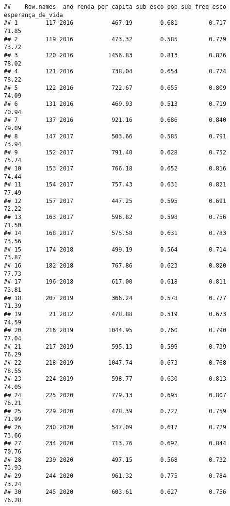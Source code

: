 \documentclass[
]{article}
\begin{document}
\begin{verbatim}
##    Row.names  ano renda_per_capita sub_esco_pop sub_freq_esco esperança_de_vida
## 1        117 2016           467.19        0.681         0.717             71.85
## 2        119 2016           473.32        0.585         0.779             73.72
## 3        120 2016          1456.83        0.813         0.826             78.02
## 4        121 2016           738.04        0.654         0.774             78.22
## 5        122 2016           722.67        0.655         0.809             74.09
## 6        131 2016           469.93        0.513         0.719             70.94
## 7        137 2016           921.16        0.686         0.840             79.09
## 8        147 2017           503.66        0.585         0.791             73.94
## 9        152 2017           791.40        0.628         0.752             75.74
## 10       153 2017           766.18        0.652         0.816             74.44
## 11       154 2017           757.43        0.631         0.821             77.49
## 12       157 2017           447.25        0.595         0.691             72.22
## 13       163 2017           596.82        0.598         0.756             71.50
## 14       168 2017           575.58        0.631         0.783             73.56
## 15       174 2018           499.19        0.564         0.714             73.87
## 16       182 2018           767.86        0.623         0.820             77.73
## 17       196 2018           617.00        0.618         0.811             73.81
## 18       207 2019           366.24        0.578         0.777             71.39
## 19        21 2012           478.88        0.519         0.673             74.59
## 20       216 2019          1044.95        0.760         0.790             77.04
## 21       217 2019           595.13        0.599         0.739             76.29
## 22       218 2019          1047.74        0.673         0.768             78.55
## 23       224 2019           598.77        0.630         0.813             74.05
## 24       225 2020           779.13        0.695         0.807             76.21
## 25       229 2020           478.39        0.727         0.759             71.99
## 26       230 2020           547.09        0.617         0.729             73.66
## 27       234 2020           713.76        0.692         0.844             70.76
## 28       239 2020           497.15        0.568         0.732             73.93
## 29       244 2020           961.32        0.775         0.784             73.24
## 30       245 2020           603.61        0.627         0.756             76.28

\end{verbatim}
\end{document}
